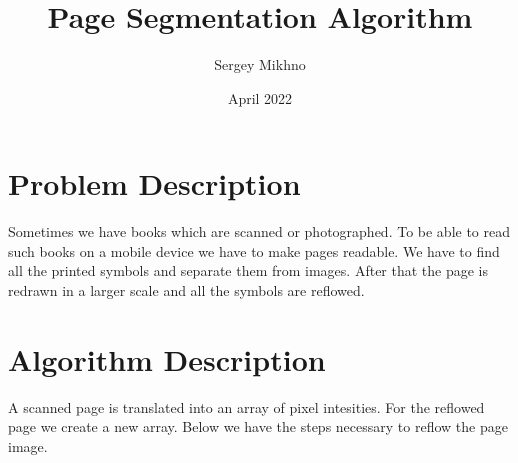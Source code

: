 \documentclass{article}
\title{Page Segmentation Algorithm}
\author{Sergey Mikhno}
\date{April 2022}
\begin{document}
\maketitle

\begin{multicols}{2}
\section{Problem Description}
Sometimes we have books which are scanned or photographed. To be able to read such books on a mobile device we have to make pages readable. We have to find all the printed symbols and separate them from images. After that the page is redrawn in a larger scale and all the symbols are reflowed.

\section{Algorithm Description}

A scanned page is translated into an array of pixel intesities. For the reflowed page we create a new array. Below we have the steps necessary to reflow the page image.


\end{multicols}
\end{document}
